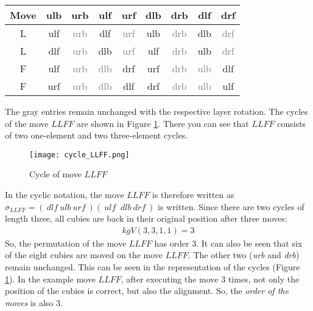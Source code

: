 \begin{center}
\begin{tabular}{ccccccccc}
\toprule
\textbf{Move} & \textbf{ulb} & \textbf{urb} & \textbf{ulf} & \textbf{urf} & \textbf{dlb} & \textbf{drb} & \textbf{dlf} & \textbf{drf} \\
\midrule

L & ulf & \textcolor{gray}{urb} & dlf & \textcolor{gray}{urf} & ulb & \textcolor{gray}{drb} & dlb & \textcolor{gray}{drf} \\

L & dlf & \textcolor{gray}{urb} & dlb & \textcolor{gray}{urf} & ulf & \textcolor{gray}{drb} & ulb & \textcolor{gray}{drf} \\

F & ulf & \textcolor{gray}{urb} & \textcolor{gray}{dlb} & drf & urf & \textcolor{gray}{drb} & \textcolor{gray}{ulb} & dlf \\

F & urf & \textcolor{gray}{urb} & \textcolor{gray}{dlb} & dlf & drf & \textcolor{gray}{drb} & \textcolor{gray}{ulb} & ulf \\
\bottomrule
\end{tabular}
\end{center}
The gray entries remain unchanged with the respective layer rotation.\newpage
The cycles of the move $LLFF$ are shown in Figure \ref{CycleOfLLFF}. There you can see that $LLFF$ consists of two one-element and two three-element cycles.
\begin{figure}[H]
\centering
\texttt{[image: cycle\_LLFF.png]}
\caption[Cycle of move $LLFF$]{Cycle of move $LLFF$}
\label{CycleOfLLFF}
\end{figure}
In the cyclic notation, the move $LLFF$ is therefore written as $\sigma_{LLFF}=( \ \textit{dlf} \ \textit{ulb} \ \textit{urf}\ )(\ \textit{ulf} \ \textit{ dlb} \ \textit{drf} \ )$ is written.
Since there are two cycles of length three, all cubies are back in their original position after three moves:
\begin{align*}
kgV(3,3,1,1)=3
\end{align*}
So, the permutation of the move $LLFF$ has order $3$.
It can also be seen that six of the eight cubies are moved on the move $LLFF$. The other two (\textit{urb} and \textit{drb}) remain unchanged. This can be seen in the representation of the cycles (Figure \ref{CycleOfLLFF}).
In the example move $LLFF$, after executing the move $3$ times, not only the position of the cubies is correct, but also the alignment. So, the \textit{order of the moves} is also 3. 

